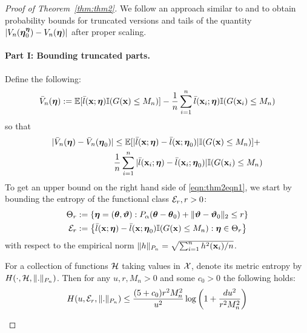 \documentclass[11pt,letterpaper]{article}
\numberwithin{equation}{section}
\begin{document}
\begin{proof}[Proof of Theorem~\ref{thm:thm2}]
We follow an approach similar to \cite{StadlerEtal10} and \cite{FengSimon17} to obtain probability bounds for truncated versions and tails of the quantity $|V_n({\boldsymbol{\eta}}_0^{\boldsymbol{\eta}}) - V_n({\boldsymbol{\eta}})|$ after proper scaling.

\paragraph{Part I: Bounding truncated parts.} Define the following:
%
\begin{align*}
\bar V_n({\boldsymbol{\eta}}) := {\mathbb{E}} [\bar l({\bf{x}}; {\boldsymbol{\eta}}) {\mathbb{I}}(G({\bf{x}}) \leq M_n)] -
\frac{1}{n} \sum_{i=1}^n\bar l({\bf{x}}_i; {\boldsymbol{\eta}}) {\mathbb{I}}(G({\bf{x}}_i) \leq M_n)
\end{align*}
%
so that
\begin{align}
| \bar V_n({\boldsymbol{\eta}}) - \bar V_n({\boldsymbol{\eta}}_0) | & \leq
{\mathbb{E}} [| \bar l({\bf{x}}; {\boldsymbol{\eta}}) -  \bar l({\bf{x}}; {\boldsymbol{\eta}}_0)| {\mathbb{I}}(G({\bf{x}}) \leq M_n)] + \notag\\
& \frac{1}{n} \sum_{i=1}^n | \bar l({\bf{x}}_i; {\boldsymbol{\eta}}) -  \bar l({\bf{x}}_i; {\boldsymbol{\eta}}_0)| {\mathbb{I}}(G({\bf{x}}_i) \leq M_n)
\label{eqn:thm2eqn1}
\end{align}
%
To get an upper bound on the right hand side of \eqref{eqn:thm2eqn1}, we start by bounding the entropy of the functional class ${\cal{E}}_r, r >0$:
%
\begin{align*}
\Theta_r & := \{ {\boldsymbol{\eta}} = ({\boldsymbol{\theta}}, {\boldsymbol{\vartheta}}): 
P_\alpha({\boldsymbol{\theta}} - {\boldsymbol{\theta}}_0) + \| {\boldsymbol{\vartheta}} - {\boldsymbol{\vartheta}}_0 \|_2 \leq r \}\\
{\cal{E}}_r & := \left\{ \bar l({\bf{x}}; {\boldsymbol{\eta}}) -  \bar l({\bf{x}}; {\boldsymbol{\eta}}_0) {\mathbb{I}}(G({\bf{x}}) \leq M_n): {\boldsymbol{\eta}} \in \Theta_r
\right\}
\end{align*}
%
with respect to the empirical norm $\| h \|_{P_n} = \sqrt{\sum_{i=1}^n h^2 ({\bf{x}}_i)/n}$.

\begin{Lemma}\label{lemma:thm2lemma1}
For a collection of functions ${\cal{H}}$ taking values in ${\cal{X}}$, denote its metric entropy by $H(\cdot, {\cal{H}}, \|.\|_{P_n})$. Then for any $u, r, M_n>0$ and some $c_0 > 0$ the following holds:
%
$$
H(u, {\cal{E}}_r, \|.\|_{P_n}) \leq \frac{ (5 + c_0) r^2 M_n^2}{u^2}
\log \left(1 + \frac{d u^2}{r^2 M_n^2} \right)
$$
%
\end{Lemma}


\end{proof}
\end{document}
